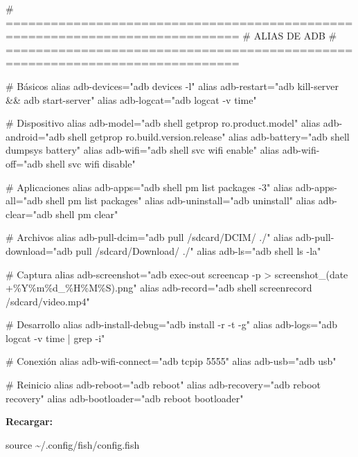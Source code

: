 \documentclass[
  doc,
  floatsintext,
  longtable,
  a4paper,
  nolmodern,
  notxfonts,
  notimes,
  12pt,
  colorlinks=true,linkcolor=blue,citecolor=blue,urlcolor=blue]{apa7}
\newenvironment{Shaded}{\begin{snugshade}}{\end{snugshade}}
\newcommand{\NormalTok}[1]{\textcolor[rgb]{0.00,0.23,0.31}{#1}}
\begin{document}
\begin{Shaded}
\begin{Highlighting}[]
\NormalTok{\# =============================================================================}
\NormalTok{\# ALIAS DE ADB}
\NormalTok{\# =============================================================================}

\NormalTok{\# Básicos}
\NormalTok{alias adb{-}devices="adb devices {-}l"}
\NormalTok{alias adb{-}restart="adb kill{-}server \&\& adb start{-}server"}
\NormalTok{alias adb{-}logcat="adb logcat {-}v time"}

\NormalTok{\# Dispositivo}
\NormalTok{alias adb{-}model="adb shell getprop ro.product.model"}
\NormalTok{alias adb{-}android="adb shell getprop ro.build.version.release"}
\NormalTok{alias adb{-}battery="adb shell dumpsys battery"}
\NormalTok{alias adb{-}wifi="adb shell svc wifi enable"}
\NormalTok{alias adb{-}wifi{-}off="adb shell svc wifi disable"}

\NormalTok{\# Aplicaciones}
\NormalTok{alias adb{-}apps="adb shell pm list packages {-}3"}
\NormalTok{alias adb{-}apps{-}all="adb shell pm list packages"}
\NormalTok{alias adb{-}uninstall="adb uninstall"}
\NormalTok{alias adb{-}clear="adb shell pm clear"}

\NormalTok{\# Archivos}
\NormalTok{alias adb{-}pull{-}dcim="adb pull /sdcard/DCIM/ ./"}
\NormalTok{alias adb{-}pull{-}download="adb pull /sdcard/Download/ ./"}
\NormalTok{alias adb{-}ls="adb shell ls {-}la"}

\NormalTok{\# Captura}
\NormalTok{alias adb{-}screenshot="adb exec{-}out screencap {-}p \textgreater{} screenshot\_(date +\%Y\%m\%d\_\%H\%M\%S).png"}
\NormalTok{alias adb{-}record="adb shell screenrecord /sdcard/video.mp4"}

\NormalTok{\# Desarrollo}
\NormalTok{alias adb{-}install{-}debug="adb install {-}r {-}t {-}g"}
\NormalTok{alias adb{-}logs="adb logcat {-}v time | grep {-}i"}

\NormalTok{\# Conexión}
\NormalTok{alias adb{-}wifi{-}connect="adb tcpip 5555"}
\NormalTok{alias adb{-}usb="adb usb"}

\NormalTok{\# Reinicio}
\NormalTok{alias adb{-}reboot="adb reboot"}
\NormalTok{alias adb{-}recovery="adb reboot recovery"}
\NormalTok{alias adb{-}bootloader="adb reboot bootloader"}
\end{Highlighting}
\end{Shaded}

\textbf{Recargar:}

\begin{Shaded}
\begin{Highlighting}[]
\NormalTok{source \textasciitilde{}/.config/fish/config.fish}
\end{Highlighting}
\end{Shaded}
\end{document}
